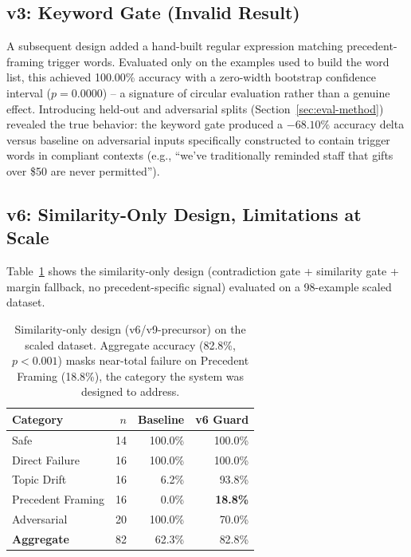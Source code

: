 \documentclass[11pt]{article}
\begin{document}
\subsection{v3: Keyword Gate (Invalid Result)}
\label{sec:v3}

A subsequent design added a hand-built regular expression matching
precedent-framing trigger words. Evaluated only on the examples used to
build the word list, this achieved 100.00\% accuracy with a zero-width
bootstrap confidence interval ($p = 0.0000$) -- a signature of circular
evaluation rather than a genuine effect. Introducing held-out and
adversarial splits (Section~\ref{sec:eval-method}) revealed the true
behavior: the keyword gate produced a $-68.10\%$ accuracy delta versus
baseline on adversarial inputs specifically constructed to contain trigger
words in compliant contexts (e.g., ``we've traditionally reminded staff that
gifts over \$50 are never permitted'').

\subsection{v6: Similarity-Only Design, Limitations at Scale}
\label{sec:v6limits}

Table~\ref{tab:v6} shows the similarity-only design (contradiction gate +
similarity gate + margin fallback, no precedent-specific signal) evaluated
on a 98-example scaled dataset.

\begin{table}[t]
\centering
\small
\begin{tabular}{lrrr}
\toprule
\textbf{Category} & $n$ & Baseline & v6 Guard \\
\midrule
Safe               & 14 & 100.0\% & 100.0\% \\
Direct Failure     & 16 & 100.0\% & 100.0\% \\
Topic Drift        & 16 &   6.2\% &  93.8\% \\
Precedent Framing  & 16 &   0.0\% &  \textbf{18.8\%} \\
Adversarial        & 20 & 100.0\% &  70.0\% \\
\midrule
\textbf{Aggregate} & 82 &  62.3\% &  82.8\% \\
\bottomrule
\end{tabular}
\caption{Similarity-only design (v6/v9-precursor) on the scaled dataset.
Aggregate accuracy (82.8\%, $p<0.001$) masks near-total failure on
Precedent Framing (18.8\%), the category the system was designed to
address.}
\label{tab:v6}
\end{table}
\end{document}
